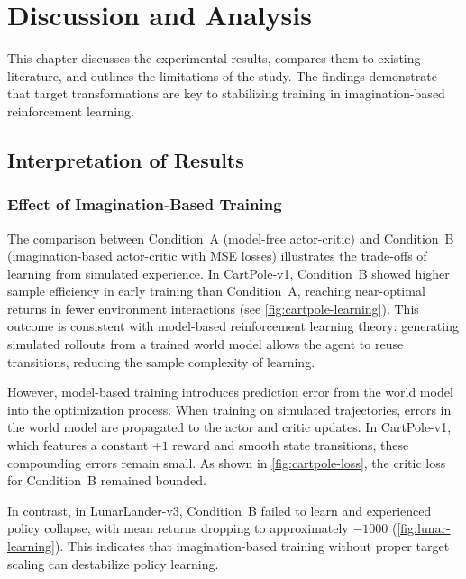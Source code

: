 \chapter{Discussion and Analysis}
\label{ch:evaluation}

This chapter discusses the experimental results, compares them to existing literature, and outlines the limitations of the study. The findings demonstrate that target transformations are key to stabilizing training in imagination-based reinforcement learning.

\section{Interpretation of Results}

\subsection{Effect of Imagination-Based Training}

The comparison between Condition~A (model-free actor-critic) and Condition~B (imagination-based actor-critic with MSE losses) illustrates the trade-offs of learning from simulated experience. In CartPole-v1, Condition~B showed higher sample efficiency in early training than Condition~A, reaching near-optimal returns in fewer environment interactions (see \cref{fig:cartpole-learning}). This outcome is consistent with model-based reinforcement learning theory: generating simulated rollouts from a trained world model allows the agent to reuse transitions, reducing the sample complexity of learning.

However, model-based training introduces prediction error from the world model into the optimization process. When training on simulated trajectories, errors in the world model are propagated to the actor and critic updates. In CartPole-v1, which features a constant $+1$ reward and smooth state transitions, these compounding errors remain small. As shown in \cref{fig:cartpole-loss}, the critic loss for Condition~B remained bounded.

In contrast, in LunarLander-v3, Condition~B failed to learn and experienced policy collapse, with mean returns dropping to approximately $-1000$ (\cref{fig:lunar-learning}). This indicates that imagination-based training without proper target scaling can destabilize policy learning.

